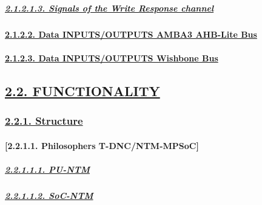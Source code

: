 \documentclass[
]{article}
\begin{document}
\hypertarget{signals-of-the-write-response-channel-1}{%
\subparagraph{\texorpdfstring{\protect\hyperlink{signals-of-the-write-response-channel-3}{2.1.2.1.3.
Signals of the Write Response
channel}}{2.1.2.1.3. Signals of the Write Response channel}}\label{signals-of-the-write-response-channel-1}}

\hypertarget{data-inputsoutputs-amba3-ahb-lite-bus}{%
\paragraph{\texorpdfstring{\protect\hyperlink{data-inputsoutputs-amba3-ahb-lite-bus-1}{2.1.2.2.
Data INPUTS/OUTPUTS AMBA3 AHB-Lite
Bus}}{2.1.2.2. Data INPUTS/OUTPUTS AMBA3 AHB-Lite Bus}}\label{data-inputsoutputs-amba3-ahb-lite-bus}}

\hypertarget{data-inputsoutputs-wishbone-bus}{%
\paragraph{\texorpdfstring{\protect\hyperlink{data-inputsoutputs-wishbone-bus-1}{2.1.2.3.
Data INPUTS/OUTPUTS Wishbone
Bus}}{2.1.2.3. Data INPUTS/OUTPUTS Wishbone Bus}}\label{data-inputsoutputs-wishbone-bus}}

\hypertarget{functionality}{%
\subsection{\texorpdfstring{\protect\hyperlink{functionality-1}{2.2.
FUNCTIONALITY}}{2.2. FUNCTIONALITY}}\label{functionality}}

\hypertarget{structure}{%
\subsubsection{\texorpdfstring{\protect\hyperlink{structure-1}{2.2.1.
Structure}}{2.2.1. Structure}}\label{structure}}

\hypertarget{philosophers-t-dncntm-mpsoc}{%
\paragraph{{[}2.2.1.1. Philosophers
T-DNC/NTM-MPSoC{]}}\label{philosophers-t-dncntm-mpsoc}}

\hypertarget{pu-ntm}{%
\subparagraph{\texorpdfstring{\protect\hyperlink{pu-ntm-3}{2.2.1.1.1.
PU-NTM}}{2.2.1.1.1. PU-NTM}}\label{pu-ntm}}

\hypertarget{soc-ntm}{%
\subparagraph{\texorpdfstring{\protect\hyperlink{soc-ntm-3}{2.2.1.1.2.
SoC-NTM}}{2.2.1.1.2. SoC-NTM}}\label{soc-ntm}}
\end{document}

